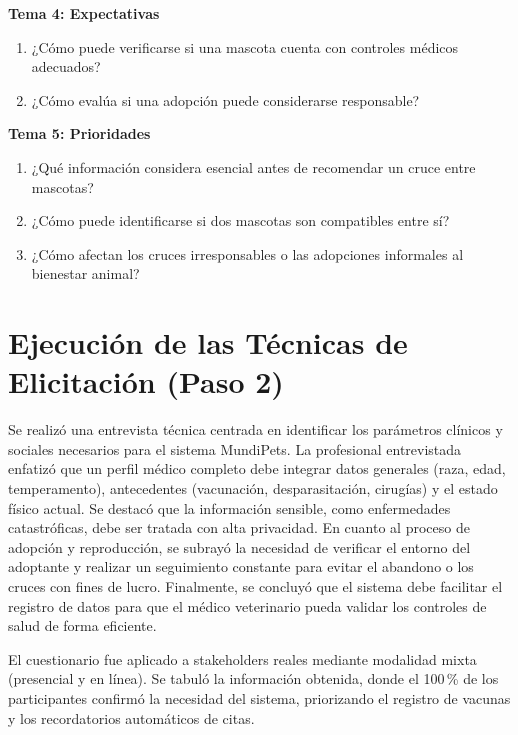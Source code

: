 \documentclass[journal,onecolumn]{IEEEtran}
\begin{document}
\noindent\textbf{Tema 4: Expectativas}
\begin{enumerate}[label=\textbf{P\arabic*.}, leftmargin=*, resume]
	\item ¿Cómo puede verificarse si una mascota cuenta con controles médicos adecuados?
	\item ¿Cómo evalúa si una adopción puede considerarse responsable?
\end{enumerate}

\noindent\textbf{Tema 5: Prioridades}
\begin{enumerate}[label=\textbf{P\arabic*.}, leftmargin=*, resume]
	\item ¿Qué información considera esencial antes de recomendar un cruce entre mascotas?
	\item ¿Cómo puede identificarse si dos mascotas son compatibles entre sí?
	\item ¿Cómo afectan los cruces irresponsables o las adopciones informales al bienestar animal?
\end{enumerate}

\newpage

\section{Ejecución de las Técnicas de Elicitación (Paso 2)}

Se realizó una entrevista técnica centrada en identificar los parámetros
clínicos y sociales necesarios para el sistema MundiPets. La profesional
entrevistada enfatizó que un perfil médico completo debe integrar datos
generales (raza, edad, temperamento), antecedentes (vacunación,
desparasitación, cirugías) y el estado físico actual. Se destacó que la
información sensible, como enfermedades catastróficas, debe ser tratada con
alta privacidad. En cuanto al proceso de adopción y reproducción, se
subrayó la necesidad de verificar el entorno del adoptante y realizar un
seguimiento constante para evitar el abandono o los cruces con fines de
lucro. Finalmente, se concluyó que el sistema debe facilitar el registro de
datos para que el médico veterinario pueda validar los controles de salud
de forma eficiente.

El cuestionario fue aplicado a stakeholders reales mediante modalidad mixta
(presencial y en línea). Se tabuló la información obtenida, donde el 100\,\%
de los participantes confirmó la necesidad del sistema, priorizando el
registro de vacunas y los recordatorios automáticos de citas.
\end{document}
